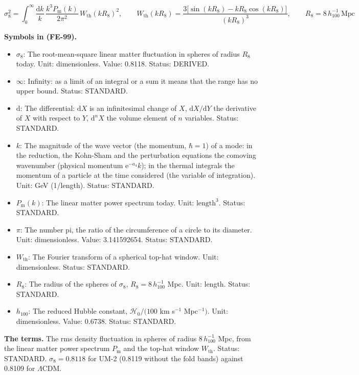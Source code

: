 \documentclass[
  10pt,
]{article}
\providecommand{\tightlist}{%
  \setlength{\itemsep}{0pt}\setlength{\parskip}{0pt}}
\begin{document}
\[
\sigma_8^2 = \int_0^\infty\frac{\mathrm{d}k}{k}\,\frac{k^3P_{\mathrm{m}}(k)}{2\pi^2}\,W_{
 \mathrm{th}}(kR_8)^2,\qquad
W_{\mathrm{th}}(kR_8) = \frac{3\big[\sin(kR_8) - kR_8\cos(kR_8)\big]}{(kR_8)^3},\qquad R_8 =
 8\,h_{100}^{-1}\,\text{Mpc} \tag{FE-99}
\]

\textbf{Symbols in (FE-99).}

\begin{itemize}
\tightlist
\item
  \(\sigma_8\): The root-mean-square linear matter fluctuation in
  spheres of radius \(R_8\) today. Unit: dimensionless. Value: 0.8118.
  Status: DERIVED.
\item
  \(\infty\): Infinity: as a limit of an integral or a sum it means that
  the range has no upper bound. Status: STANDARD.
\item
  \(\mathrm{d}\): The differential: \(\mathrm{d}X\) is an infinitesimal
  change of \(X\), \(\mathrm{d}X/\mathrm{d}Y\) the derivative of \(X\)
  with respect to \(Y\), \(\mathrm{d}^nX\) the volume element of \(n\)
  variables. Status: STANDARD.
\item
  \(k\): The magnitude of the wave vector (the momentum, \(\hbar = 1\))
  of a mode: in the reduction, the Kohn-Sham and the perturbation
  equations the comoving wavenumber (physical momentum
  \(\mathrm{e}^{-a_4}k\)); in the thermal integrals the momentum of a
  particle at the time considered (the variable of integration). Unit:
  GeV (1/length). Status: STANDARD.
\item
  \(P_{\mathrm{m}}(k)\): The linear matter power spectrum today. Unit:
  \(\mathrm{length}^{3}\). Status: STANDARD.
\item
  \(\pi\): The number pi, the ratio of the circumference of a circle to
  its diameter. Unit: dimensionless. Value: 3.141592654. Status:
  STANDARD.
\item
  \(W_{\mathrm{th}}\): The Fourier transform of a spherical top-hat
  window. Unit: dimensionless. Status: STANDARD.
\item
  \(R_8\): The radius of the spheres of \(\sigma_8\),
  \(R_8 = 8\,h_{100}^{-1}\) Mpc. Unit: length. Status: STANDARD.
\item
  \(h_{100}\): The reduced Hubble constant, \(\mathcal{H}_0/(100\) km
  s\(^{-1}\) Mpc\(^{-1})\). Unit: dimensionless. Value: 0.6738. Status:
  STANDARD.
\end{itemize}

\textbf{The terms.} The rms density fluctuation in spheres of radius
\(8\,h_{100}^{-1}\) Mpc, from the linear matter power spectrum
\(P_{\mathrm{m}}\) and the top-hat window \(W_{\mathrm{th}}\). Status:
STANDARD. \(\sigma_8 = 0.8118\) for UM-2 (0.8119 without the fold bands)
against 0.8109 for \(\Lambda\)CDM.
\end{document}
